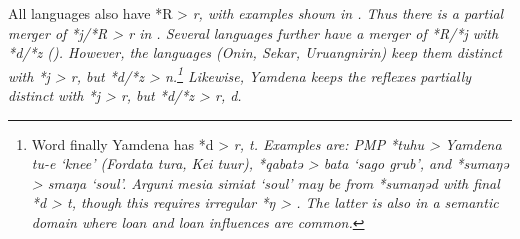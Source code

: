 All  languages also have *R > \it{r},
with examples shown in .
Thus there is a partial merger of *j/*R > \it{r} in .
Several languages further have a merger of *R/*j with *d/*z ().
However, the  languages (Onin,
Sekar, Uruangnirin) keep them distinct with *j > \it{r},
but *d/*z > \it{n}.\footnote{
		Word finally Yamdena has *d > \it{r}, \it{t}.
		Examples are: PMP *tuhu > Yamdena \it{tu-e}
		‘knee’ (Fordata \it{tura}, Kei \it{tuur}),
		*qabatə > \it{bata} ‘sago grub’,
		and *sumaŋə > \it{smaŋa} ‘soul’.
		Arguni \it{mesia simiat} ‘soul’ may be from *sumaŋəd with final
		*d > \it{t}, though this requires irregular *ŋ > {\0}.
		The latter is also in a semantic domain where loan
		and loan influences are common.}
Likewise, Yamdena keeps the reflexes partially distinct with *j > \it{r},
but *d/*z > \it{r, d}.

